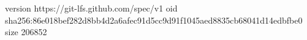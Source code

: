 version https://git-lfs.github.com/spec/v1
oid sha256:86e018bef282d8bb4d2a6afec91d5cc9d91f1045aed8835cb68041d14edbfbe0
size 206852
